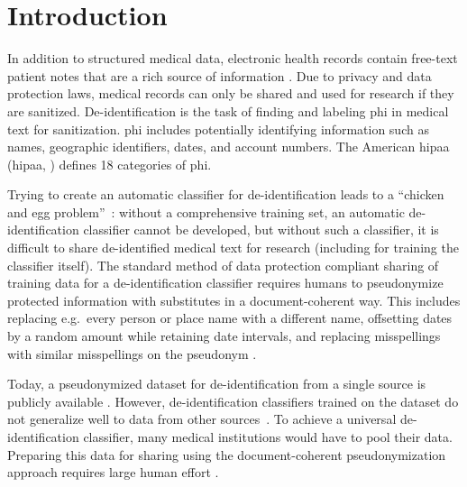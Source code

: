 

\section{Introduction}\label{sec:introduction}
%
In addition to structured medical data, electronic health records contain free-text patient notes that are a rich source of information \citep{jensen2012mining}.
%
Due to privacy and data protection laws, medical records can only be shared and used for research if they are sanitized.
%
De-identification is the task of finding and labeling \ac{phi} in medical text for sanitization.
%
\Ac{phi} includes potentially identifying information such as names, geographic identifiers, dates, and account numbers.
%
The American \acl{hipaa} (\acs{hipaa}, \citeyear{usa1996hipaa}) defines 18 categories of \ac{phi}.

%
Trying to create an automatic classifier for de-identification leads to a ``chicken and egg problem''~\citep{uzuner2007evaluating}: without a comprehensive training set, an automatic de-identification classifier cannot be developed, but without such a classifier, it is difficult to share de-identified medical text for research (including for training the classifier itself).
%
The standard method of data protection compliant sharing of training data for a de-identification classifier requires humans to pseudonymize protected information with substitutes in a document-coherent way.
%
This includes replacing e.g.\ every person or place name with a different name, offsetting dates by a random amount while retaining date intervals, and replacing misspellings with similar misspellings on the pseudonym \cite{uzuner2007evaluating}.

%
Today, a pseudonymized dataset for de-identification from a single source is publicly available \citep{stubbs2015annotating}.
%
However, de-identification classifiers trained on the dataset do not generalize well to data from other sources~\citep{stubbs2017identification}.
%
To achieve a universal de-identification classifier, many medical institutions would have to pool their data.
%
Preparing this data for sharing using the document-coherent pseudonymization approach requires large human effort \citep{dernoncourt2017identification}.

